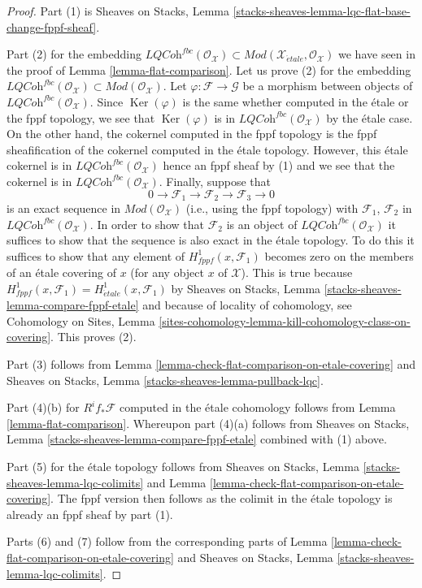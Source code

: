 \documentclass[10pt,a4paper]{amsart}
\theoremstyle{plain}
\theoremstyle{definition}
\theoremstyle{remark}
\numberwithin{equation}{subsection}
\def\etale{{\acute{e}tale}}
\def\Ker{\mathop{\mathrm{Ker}}}
\begin{document}
\begin{proof}
Part (1) is
Sheaves on Stacks, Lemma
\ref{stacks-sheaves-lemma-lqc-flat-base-change-fppf-sheaf}.

\medskip\noindent
Part (2) for the embedding
$\textit{LQCoh}^{fbc}(\mathcal{O}_\mathcal{X}) \subset
\textit{Mod}(\mathcal{X}_\etale, \mathcal{O}_\mathcal{X})$
we have seen in the proof of
Lemma \ref{lemma-flat-comparison}.
Let us prove (2) for the embedding
$\textit{LQCoh}^{fbc}(\mathcal{O}_\mathcal{X}) \subset
\textit{Mod}(\mathcal{O}_\mathcal{X})$.
Let $\varphi : \mathcal{F} \to \mathcal{G}$ be a morphism between
objects of $\textit{LQCoh}^{fbc}(\mathcal{O}_\mathcal{X})$. Since
$\Ker(\varphi)$
is the same whether computed in the \'etale or the fppf
topology, we see that $\Ker(\varphi)$ is in
$\textit{LQCoh}^{fbc}(\mathcal{O}_\mathcal{X})$
by the \'etale case. On the other hand,
the cokernel computed in the fppf topology is the fppf sheafification
of the cokernel computed in the \'etale topology. However, this
\'etale cokernel is in $\textit{LQCoh}^{fbc}(\mathcal{O}_\mathcal{X})$
hence an fppf sheaf
by (1) and we see that the cokernel is in
$\textit{LQCoh}^{fbc}(\mathcal{O}_\mathcal{X})$.
Finally, suppose that
$$
0 \to \mathcal{F}_1 \to \mathcal{F}_2 \to \mathcal{F}_3 \to 0
$$
is an exact sequence in $\textit{Mod}(\mathcal{O}_\mathcal{X})$
(i.e., using the fppf topology) with $\mathcal{F}_1$, $\mathcal{F}_2$
in $\textit{LQCoh}^{fbc}(\mathcal{O}_\mathcal{X})$. In order to show that
$\mathcal{F}_2$ is an object of $\textit{LQCoh}^{fbc}(\mathcal{O}_\mathcal{X})$
it suffices to show that
the sequence is also exact in the \'etale topology. To do this it
suffices to show that any element of $H^1_{fppf}(x, \mathcal{F}_1)$
becomes zero on the members of an \'etale covering of $x$ (for any
object $x$ of $\mathcal{X}$). This is true because
$H^1_{fppf}(x, \mathcal{F}_1) = H^1_\etale(x, \mathcal{F}_1)$ by
Sheaves on Stacks, Lemma \ref{stacks-sheaves-lemma-compare-fppf-etale}
and because of locality of cohomology, see
Cohomology on Sites, Lemma
\ref{sites-cohomology-lemma-kill-cohomology-class-on-covering}.
This proves (2).

\medskip\noindent
Part (3) follows from
Lemma \ref{lemma-check-flat-comparison-on-etale-covering}
and
Sheaves on Stacks, Lemma \ref{stacks-sheaves-lemma-pullback-lqc}.

\medskip\noindent
Part (4)(b) for $R^if_*\mathcal{F}$ computed in the \'etale cohomology
follows from Lemma \ref{lemma-flat-comparison}.
Whereupon part (4)(a) follows from
Sheaves on Stacks, Lemma \ref{stacks-sheaves-lemma-compare-fppf-etale}
combined with (1) above.

\medskip\noindent
Part (5) for the \'etale topology follows from
Sheaves on Stacks, Lemma \ref{stacks-sheaves-lemma-lqc-colimits} and
Lemma \ref{lemma-check-flat-comparison-on-etale-covering}.
The fppf version then follows as the colimit in the \'etale
topology is already an fppf sheaf by part (1).

\medskip\noindent
Parts (6) and (7) follow from the corresponding parts of
Lemma \ref{lemma-check-flat-comparison-on-etale-covering} and
Sheaves on Stacks, Lemma \ref{stacks-sheaves-lemma-lqc-colimits}.
\end{proof}
\end{document}
